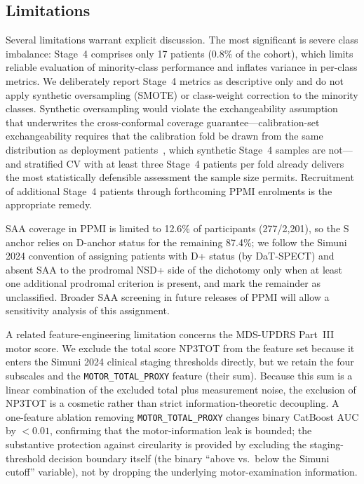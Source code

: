 \subsection{Limitations}
\label{p1:sec:discussion:limitations}
Several limitations warrant explicit discussion. The most significant is severe class imbalance: Stage~4 comprises only 17 patients (0.8\% of the cohort), which limits reliable evaluation of minority-class performance and inflates variance in per-class metrics. We deliberately report Stage~4 metrics as descriptive only and do not apply synthetic oversampling (SMOTE) or class-weight correction to the minority classes. Synthetic oversampling would violate the exchangeability assumption that underwrites the cross-conformal coverage guarantee---calibration-set exchangeability requires that the calibration fold be drawn from the same distribution as deployment patients~\cite{vovk2022}, which synthetic Stage~4 samples are not---and stratified CV with at least three Stage~4 patients per fold already delivers the most statistically defensible assessment the sample size permits. Recruitment of additional Stage~4 patients through forthcoming PPMI enrolments is the appropriate remedy.

SAA coverage in PPMI is limited to 12.6\% of participants (277/2{,}201), so the S anchor relies on D-anchor status for the remaining 87.4\%; we follow the Simuni 2024 convention of assigning patients with D+ status (by DaT-SPECT) and absent SAA to the prodromal NSD+ side of the dichotomy only when at least one additional prodromal criterion is present, and mark the remainder as unclassified. Broader SAA screening in future releases of PPMI will allow a sensitivity analysis of this assignment.

A related feature-engineering limitation concerns the MDS-UPDRS Part~III motor score. We exclude the total score NP3TOT from the feature set because it enters the Simuni 2024 clinical staging thresholds directly, but we retain the four subscales and the \texttt{MOTOR\_TOTAL\_PROXY} feature (their sum). Because this sum is a linear combination of the excluded total plus measurement noise, the exclusion of NP3TOT is a cosmetic rather than strict information-theoretic decoupling. A one-feature ablation removing \texttt{MOTOR\_TOTAL\_PROXY} changes binary CatBoost AUC by ${<}0.01$, confirming that the motor-information leak is bounded; the substantive protection against circularity is provided by excluding the staging-threshold decision boundary itself (the binary ``above vs.\ below the Simuni cutoff'' variable), not by dropping the underlying motor-examination information.

